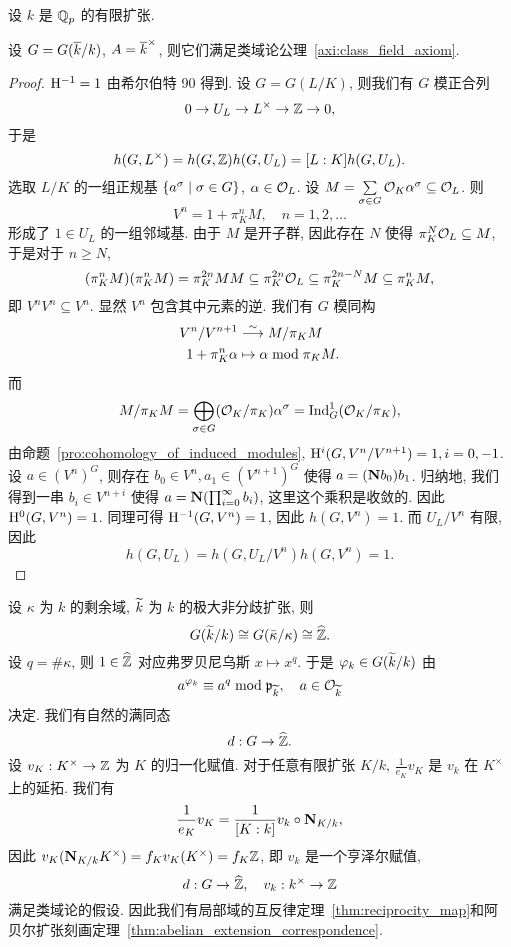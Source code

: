 设 $k$ 是 ${\mathbb{Q}}_p$ 的有限扩张.
\begin{theorem}{}{}
设 $G=G(\overline k/k)$, $A=\overline k^\times$, 则它们满足类域论公理~\ref{axi:class_field_axiom}.
\end{theorem}
\begin{proof}
${\mathrm{H}}^{-1}=1$ 由希尔伯特 90 得到.
设 $G=G(L/K)$, 则我们有 $G$ 模正合列
  \[0\rightarrow U_L\to L^\times\to {\mathbb{Z}}\to 0,\]
于是
  \[h(G,L^\times)=h(G,{\mathbb{Z}})h(G,U_L)=[L:K]h(G,U_L).\]
选取 $L/K$ 的一组正规基 $\left\{a^\sigma\mid \sigma\in G\right\}$, $\alpha\in{\mathcal{O}}_L$. 设 $M=\sum\limits_{\sigma\in G}{\mathcal{O}}_K \alpha^\sigma\subseteq {\mathcal{O}}_L$. 则 
  \[V^n=1+\pi_K^n M,\quad n=1,2,\dots\]
形成了 $1\in U_L$ 的一组邻域基. 由于 $M$ 是开子群, 因此存在 $N$ 使得 $\pi_K^N{\mathcal{O}}_L\subseteq M$, 于是对于 $n\ge N$,
  \[(\pi_K^nM)(\pi_K^n M)=\pi_K^{2n}MM\subseteq \pi_K^{2n}{\mathcal{O}}_L\subseteq\pi_K^{2n-N}M\subseteq \pi_K^n M,\]
即 $V^nV^n\subseteq V^n$. 显然 $V^n$ 包含其中元素的逆. 我们有 $G$ 模同构
  \[\begin{split}
V^n/V^{n+1}&\stackrel{\sim}{\longrightarrow} M/\pi_K M\\
1+\pi_K^n \alpha&\mapsto \alpha\bmod \pi_K M.
\end{split}\]
而 
  \[M/\pi_K M=\bigoplus_{\sigma \in G} ({\mathcal{O}}_K/\pi_K) \alpha^\sigma={\mathrm{Ind}}_G^1({\mathcal{O}}_K/\pi_K),\]
由命题~\ref{pro:cohomology_of_induced_modules}, ${\mathrm{H}}^i(G,V^n/V^{n+1})=1,i=0,-1$. 设 $a\in (V^n)^G$, 则存在 $b_0\in V^n,a_1\in(V^{n+1})^G$ 使得 $a=({\mathbf{N}} b_0)b_1$. 归纳地, 我们得到一串 $b_i\in V^{n+i}$ 使得 $a={\mathbf{N}}(\prod_{i=0}^\infty b_i)$, 这里这个乘积是收敛的. 因此 ${\mathrm{H}}^0(G,V^n)=1$. 同理可得 ${\mathrm{H}}^{-1}(G,V^n)=1$, 因此 $h(G,V^n)=1$. 而 $U_L/V^n$ 有限, 因此
  \[h(G,U_L)=h(G,U_L/V^n)h(G,V^n)=1.\]
\end{proof}




设 $\kappa$ 为 $k$ 的剩余域, $\widetilde k$ 为 $k$ 的极大非分歧扩张, 则
  \[G(\widetilde k/k)\cong G(\bar \kappa/\kappa)\cong \widehat{{\mathbb{Z}}}.\]
设 $q=\# \kappa$, 则 $1\in\widehat {{\mathbb{Z}}}$ 对应弗罗贝尼乌斯 $x\mapsto x^q$. 于是 $\varphi_k\in G(\widetilde k/k)$ 由
  \[a^{\varphi_k}\equiv a^q\bmod{\mathfrak{p}}_{\widetilde k},\quad a\in{\mathcal{O}}_{\widetilde k}\]
决定. 我们有自然的满同态
  \[d:G\to\widehat{{\mathbb{Z}}}.\]
设 $v_K:K^\times\to{\mathbb{Z}}$ 为 $K$ 的归一化赋值. 对于任意有限扩张 $K/k$, $\frac{1}{e_K}v_K$ 是 $v_k$ 在 $K^\times$ 上的延拓. 我们有
  \[\frac{1}{e_K}v_K=\frac{1}{[K:k]}v_k\circ{\mathbf{N}}_{K/k},\]
因此 $v_K({\mathbf{N}}_{K/k}K^\times)=f_K v_K(K^\times)=f_K{\mathbb{Z}}$, 即 $v_k$ 是一个亨泽尔赋值,
  \[d:G\to\widehat{{\mathbb{Z}}},\quad v_k:k^\times\to{\mathbb{Z}}\]
满足类域论的假设.
因此我们有局部域的互反律定理~\ref{thm:reciprocity_map}和阿贝尔扩张刻画定理~\ref{thm:abelian_extension_correspondence}.

